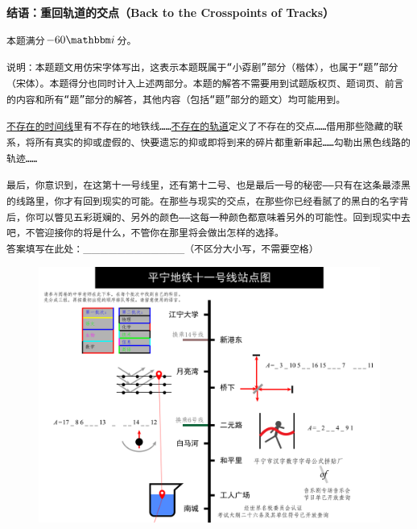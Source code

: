 \documentclass[11pt,a4paper,onecolumn,UTF8]{ctexart}
\begin{document}
	\newpage
	\noindent
	\textbf{结语：重回轨道的交点（Back to the Crosspoints of Tracks）}
	
	\texttt{本题满分$-60\ui$分。}
	
	\texttt{说明：本题题文用仿宋字体写出，这表示本题既属于“小孬剧”部分（楷体），也属于“题”部分（宋体）。本题得分也同时计入上述两部分。本题的解答不需要用到试题版权页、题词页、前言的内容和所有“题”部分的解答，其他内容（包括“题”部分的题文）均可能用到。}
	
	\texttt{\href{https://space.bilibili.com/471367896}{不存在的时间线}里有不存在的地铁线……\href{1,2,3,4,5,6,7,8,9,10,12,...}{不存在的轨道}定义了不存在的交点……借用那些隐藏的联系，将所有真实的抑或虚假的、快要遗忘的抑或即将到来的碎片都重新串起……勾勒出黑色线路的轨迹……}
	
	\texttt{最后，你意识到，在这第十一号线里，还有第十二号、也是最后一号的秘密——只有在这条最漆黑的线路里，你才有回到现实的可能。在那些与现实的交点，在那些你已经看腻了的黑白的名字背后，你可以瞥见五彩斑斓的、另外的颜色——这每一种颜色都意味着另外的可能性。回到现实中去吧，不管迎接你的将是什么，不管你在那里将会做出怎样的选择。}\\
	
	\texttt{答案填写在此处：}\_\_\_\_\_\_\_\_\_\_\_\_\texttt{（不区分大小写，不需要空格）}\\
	
	\begin{figure}[!h]
		\centering
		\includegraphics[width=0.99\columnwidth]{11A.png}
	\end{figure}
	
\end{document}
